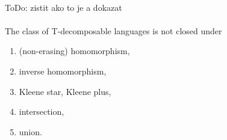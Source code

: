 \paragraph{}
\dokaz \color{red}ToDo: zistit ako to je a dokazat\color{black}\\
\square

\paragraph{}
\cveta The class of T-decomposable languages is not closed under 
\begin{enumerate}
\item (non-erasing) homomorphism,
\item inverse homomorphism,
\item Kleene star, Kleene plus,
\item intersection,
\item union.
\end{enumerate}

